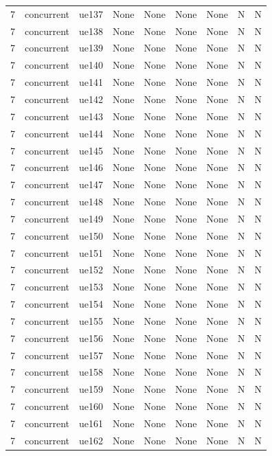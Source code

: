 \begin{table}[ht]
\begin{tabular}{|c|c|c|c|c|c|c|c|c|}
7 & concurrent & ue137 & None & None & None & None & N & N \\
7 & concurrent & ue138 & None & None & None & None & N & N \\
7 & concurrent & ue139 & None & None & None & None & N & N \\
7 & concurrent & ue140 & None & None & None & None & N & N \\
7 & concurrent & ue141 & None & None & None & None & N & N \\
7 & concurrent & ue142 & None & None & None & None & N & N \\
7 & concurrent & ue143 & None & None & None & None & N & N \\
7 & concurrent & ue144 & None & None & None & None & N & N \\
7 & concurrent & ue145 & None & None & None & None & N & N \\
7 & concurrent & ue146 & None & None & None & None & N & N \\
7 & concurrent & ue147 & None & None & None & None & N & N \\
7 & concurrent & ue148 & None & None & None & None & N & N \\
7 & concurrent & ue149 & None & None & None & None & N & N \\
7 & concurrent & ue150 & None & None & None & None & N & N \\
7 & concurrent & ue151 & None & None & None & None & N & N \\
7 & concurrent & ue152 & None & None & None & None & N & N \\
7 & concurrent & ue153 & None & None & None & None & N & N \\
7 & concurrent & ue154 & None & None & None & None & N & N \\
7 & concurrent & ue155 & None & None & None & None & N & N \\
7 & concurrent & ue156 & None & None & None & None & N & N \\
7 & concurrent & ue157 & None & None & None & None & N & N \\
7 & concurrent & ue158 & None & None & None & None & N & N \\
7 & concurrent & ue159 & None & None & None & None & N & N \\
7 & concurrent & ue160 & None & None & None & None & N & N \\
7 & concurrent & ue161 & None & None & None & None & N & N \\
7 & concurrent & ue162 & None & None & None & None & N & N \\

\end{tabular}
\end{table}
